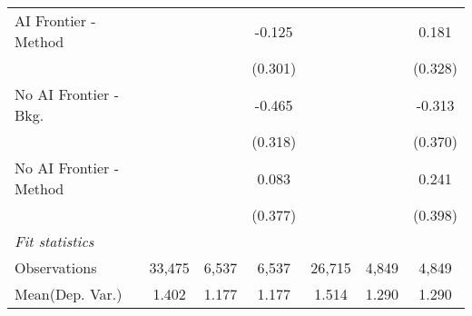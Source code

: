 \begin{tabular}{lcccccc}
   AI Frontier - Method    &               &              & -0.125        &               &               & 0.181\\   
                           &               &              & (0.301)       &               &               & (0.328)\\   
   No AI Frontier - Bkg.   &               &              & -0.465        &               &               & -0.313\\   
                           &               &              & (0.318)       &               &               & (0.370)\\   
   No AI Frontier - Method &               &              & 0.083         &               &               & 0.241\\   
                           &               &              & (0.377)       &               &               & (0.398)\\   
   \midrule
   \emph{Fit statistics}\\
   Observations            & 33,475        & 6,537        & 6,537         & 26,715        & 4,849         & 4,849\\  
Mean(Dep. Var.) & 1.402 & 1.177 & 1.177 & 1.514 & 1.290 & 1.290 \\
   

\end{tabular}
